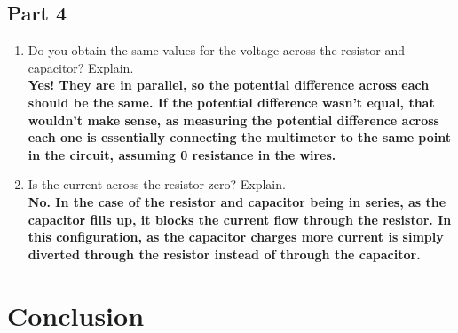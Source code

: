 \documentclass[titlepage]{article}
\begin{document}
    \subsection{Part 4}
    \begin{enumerate}
        \item Do you obtain the same values for the voltage across the resistor and capacitor? Explain.\\ 
            \textbf{Yes! They are in parallel, so the potential difference across each should be the same. If the potential difference wasn’t equal, that wouldn’t make sense, as measuring the potential difference across each one is essentially connecting the multimeter to the same point in the circuit, assuming 0 resistance in the wires.}
        \item Is the current across the resistor zero? Explain.\\ 
            \textbf{No. In the case of the resistor and capacitor being in series, as the capacitor fills up, it blocks the current flow through the resistor. In this configuration, as the capacitor charges more current is simply diverted through the resistor instead of through the capacitor.}



    \end{enumerate}

	\section{Conclusion}
\end{document}
